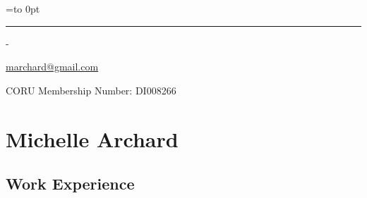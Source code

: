 \documentclass[]{article}
\date{}
\newenvironment{nospace}
  {\par\edef\theprevdepth{\the\prevdepth}\nointerlineskip
   \setbox\zerobox=\vtop to 0pt\bgroup
   \hrule height0pt\kern\dimexpr\baselineskip-\topskip\relax
  }
  {\par\vss\egroup\ht\zerobox=0pt \wd\zerobox=0pt \dp\zerobox=0pt
   \box\zerobox}
\begin{document}
\begin{nospace}\begin{flushright}
\vspace{-2em}\href{mailto:marchard@gmail.com}{marchard@gmail.com}

CORU Membership Number: DI008266
\end{flushright}\end{nospace}

\section{Michelle Archard}\label{michelle-archard}

\subsection{Work Experience}\label{work-experience}
\end{document}

